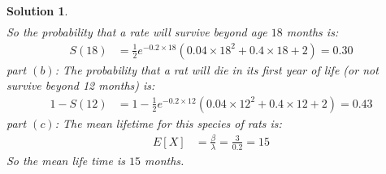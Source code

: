 \documentclass[11pt]{article}
\newtheorem{sol}{Solution}
\begin{document}
\begin{sol}
\begin{align*}
	\end{align*}
	So the probability that a rate will survive beyond age $18$ months is:
	\begin{align*}
		S(18) &=  \frac{1}{2}e^{-0.2\times 18}(0.04\times 18^2 + 0.4\times 18 + 2) = 0.30
	\end{align*}
	\hskip 2cm part $(b)$:\vskip 2mm
	The probability that a rat will die in its first year of life (or not survive beyond 12 months) is:
	\begin{align*}
		1 - S(12) &= 1 - \frac{1}{2}e^{-0.2\times 12}(0.04\times 12^2 + 0.4\times 12 + 2) = 0.43
	\end{align*}
	\hskip 2cm part $(c)$:\vskip 2mm
	The mean lifetime for this species of rats is:
	\begin{align*}
		E[X] &= \frac{\beta}{\lambda} = \frac{3}{0.2} = 15
	\end{align*}
	So the mean life time is $15$ months.
\end{sol}
\end{document}
